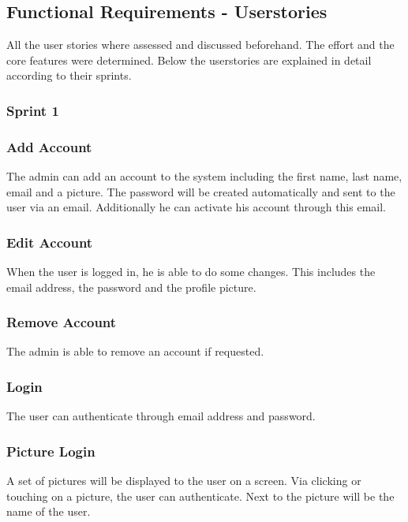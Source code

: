 \subsection{Functional Requirements -
Userstories}\label{functional-requirements---userstories}

All the user stories where assessed and discussed beforehand. The effort
and the core features were determined. Below the userstories are
explained in detail according to their sprints.

\subsubsection{Sprint 1}\label{sprint-1}

\subsubsection*{Add Account}

The admin can add an account to the system including the first name,
last name, email and a picture. The password will be created
automatically and sent to the user via an email. Additionally he can
activate his account through this email.

\subsubsection*{Edit Account}

When the user is logged in, he is able to do some changes. This includes
the email address, the password and the profile picture.

\subsubsection*{Remove Account}

The admin is able to remove an account if requested.

\subsubsection*{Login}

The user can authenticate through email address and password.

\subsubsection*{Picture Login}

A set of pictures will be displayed to the user on a screen. Via
clicking or touching on a picture, the user can authenticate. Next to
the picture will be the name of the user.

